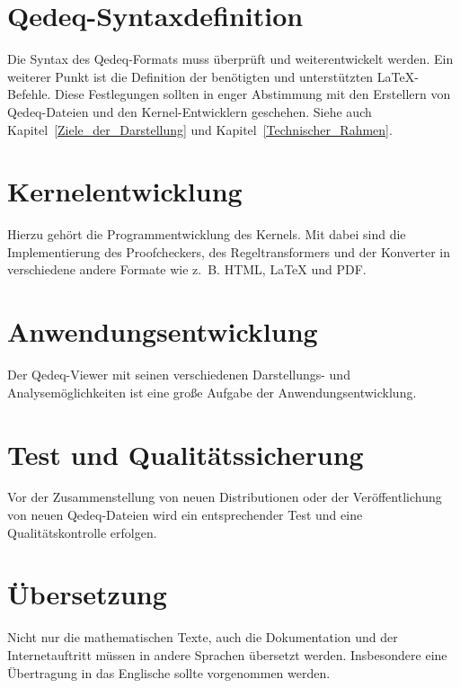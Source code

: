 \documentclass[a4paper,german,10pt,twoside]{book}
\begin{document}
{\section{Qedeq-Syntaxdefinition}
Die Syntax des Qedeq-Formats muss {\"u}berpr{\"u}ft und weiterentwickelt werden. Ein weiterer Punkt ist die
Definition der ben{\"o}tigten und unterst{\"u}tzten \LaTeX{}-Befehle. Diese Festlegungen sollten in enger
Abstimmung mit den Erstellern von Qedeq-Dateien und den Kernel-Entwicklern geschehen. Siehe auch
Kapitel~\ref{Ziele_der_Darstellung} und Kapitel~\ref{Technischer_Rahmen}.

\section{Kernelentwicklung}
Hierzu geh{\"o}rt die Programmentwicklung des Kernels. Mit dabei sind die Implementierung des
Proofcheckers, des Regeltransformers und der Konverter
in verschiedene andere Formate wie z.~B. HTML, \LaTeX{} und PDF.

\section{Anwendungsentwicklung}
Der Qedeq-Viewer mit seinen verschiedenen Darstellungs- und Analysem{\"o}glichkeiten ist eine gro{\ss}e
Aufgabe der Anwendungsentwicklung.

\section{Test und Qualit{\"a}tssicherung}
Vor der Zusammenstellung von neuen Distributionen oder der Ver{\"o}ffentlichung von neuen Qedeq-Dateien
wird ein entsprechender Test und eine Qualit{\"a}tskontrolle erfolgen.

\section{{\"U}bersetzung}
Nicht nur die mathematischen Texte, auch die Dokumentation und der Internetauftritt m{\"u}ssen in
andere Sprachen {\"u}bersetzt werden. Insbesondere eine {\"U}bertragung in das Englische sollte vorgenommen
werden.

}
\end{document}
